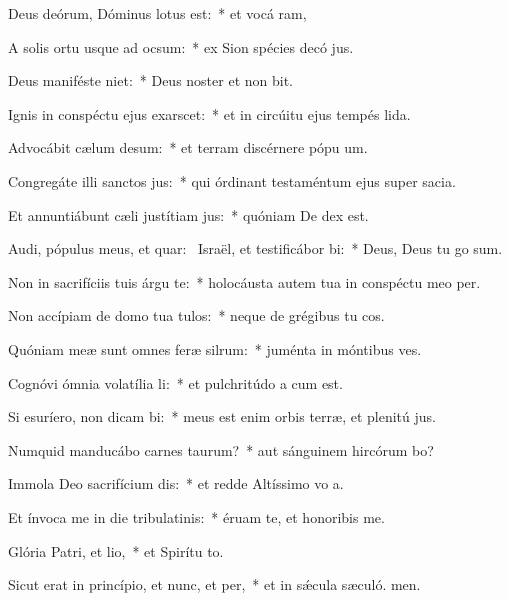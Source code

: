 \item Deus deórum, Dóminus lotus est:~* et vocá ram,
\item A solis ortu usque ad ocsum:~* ex Sion spécies decó jus.
\item Deus maniféste niet:~* Deus noster et non bit.
\item Ignis in conspéctu ejus exarscet:~* et in circúitu ejus tempés lida.
\item Advocábit cælum desum:~* et terram discérnere pópu um.
\item Congregáte illi sanctos jus:~* qui órdinant testaméntum ejus super sacia.
\item Et annuntiábunt cæli justítiam jus:~* quóniam De dex est.
\item Audi, pópulus meus, et quar:~\pscross{} Israël, et testificábor bi:~* Deus, Deus tu go sum.
\item Non in sacrifíciis tuis árgu te:~* holocáusta autem tua in conspéctu meo  per.
\item Non accípiam de domo tua tulos:~* neque de grégibus tu cos.
\item Quóniam meæ sunt omnes feræ silrum:~* juménta in móntibus  ves.
\item Cognóvi ómnia volatília li:~* et pulchritúdo a cum est.
\item Si esuríero, non dicam bi:~* meus est enim orbis terræ, et plenitú jus.
\item Numquid manducábo carnes taurum?~* aut sánguinem hircórum bo?
\item Immola Deo sacrifícium dis:~* et redde Altíssimo vo a.
\item Et ínvoca me in die tribulatinis:~* éruam te, et honoribis me.
\item Glória Patri, et lio,~* et Spirítu to.
\item Sicut erat in princípio, et nunc, et per,~* et in sǽcula sæculó. men.
